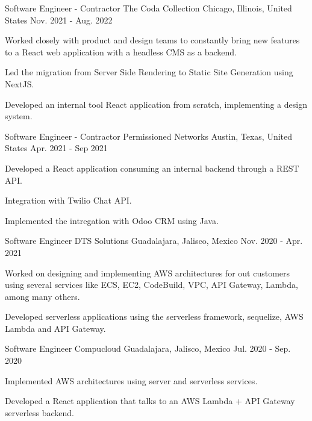 \begin{cventries}
  \cventry
    {Software Engineer - Contractor} %
    {The Coda Collection} %
    {Chicago, Illinois, United States} %
    {Nov. 2021 - Aug. 2022} %
    {
      \begin{cvitems} %
        \item {Worked closely with product and design teams to constantly bring new features to a React web application with a headless CMS as a backend.}
        \item {Led the migration from Server Side Rendering to Static Site Generation using NextJS.}
        \item {Developed an internal tool React application from scratch, implementing a design system.}
      \end{cvitems}
    }

  \cventry
    {Software Engineer - Contractor} %
    {Permissioned Networks} %
    {Austin, Texas, United States} %
    {Apr. 2021 - Sep 2021} %
    {
      \begin{cvitems} %
        \item {Developed a React application consuming an internal backend through a REST API. }
        \item {Integration with Twilio Chat API.}
        \item {Implemented the intregation with Odoo CRM using Java.}
      \end{cvitems}
    }

  \cventry
    {Software Engineer} %
    {DTS Solutions} %
    {Guadalajara, Jalisco, Mexico} %
    {Nov. 2020 - Apr. 2021} %
    {
      \begin{cvitems} %
        \item {Worked on designing and implementing AWS architectures for out customers using several services like
ECS, EC2, CodeBuild, VPC, API Gateway, Lambda, among many others.}
        \item {Developed serverless applications using the serverless framework, sequelize, AWS Lambda and API
Gateway.}
      \end{cvitems}
    }

  \cventry
    {Software Engineer} %
    {Compucloud} %
    {Guadalajara, Jalisco, Mexico} %
    {Jul. 2020 - Sep. 2020} %
    {
      \begin{cvitems} %
        \item {Implemented AWS architectures using server and serverless services.}
        \item {Developed a React application that talks to an AWS Lambda + API Gateway serverless backend.}
      \end{cvitems}
    }

\end{cventries}
